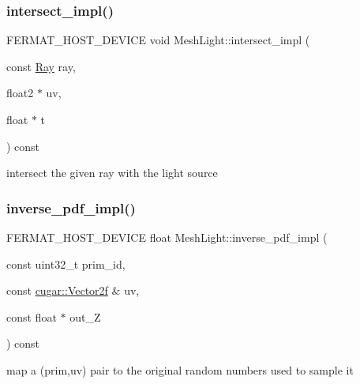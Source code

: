 \subsubsection{\texorpdfstring{intersect\+\_\+impl()}{intersect\_impl()}}
{\footnotesize\ttfamily F\+E\+R\+M\+A\+T\+\_\+\+H\+O\+S\+T\+\_\+\+D\+E\+V\+I\+CE void Mesh\+Light\+::intersect\+\_\+impl (\begin{DoxyParamCaption}\item[{const \hyperlink{struct_ray}{Ray}}]{ray,  }\item[{float2 $\ast$}]{uv,  }\item[{float $\ast$}]{t }\end{DoxyParamCaption}) const\hspace{0.3cm}{\ttfamily [inline]}}

intersect the given ray with the light source \mbox{\label{struct_mesh_light_a3c6e89823dc653d7c0b0ce28c0f8f770}} 
\subsubsection{\texorpdfstring{inverse\+\_\+pdf\+\_\+impl()}{inverse\_pdf\_impl()}}
{\footnotesize\ttfamily F\+E\+R\+M\+A\+T\+\_\+\+H\+O\+S\+T\+\_\+\+D\+E\+V\+I\+CE float Mesh\+Light\+::inverse\+\_\+pdf\+\_\+impl (\begin{DoxyParamCaption}\item[{const uint32\+\_\+t}]{prim\+\_\+id,  }\item[{const \hyperlink{structcugar_1_1_vector}{cugar\+::\+Vector2f} \&}]{uv,  }\item[{const float $\ast$}]{out\+\_\+Z }\end{DoxyParamCaption}) const\hspace{0.3cm}{\ttfamily [inline]}}

map a (prim,uv) pair to the original random numbers used to sample it \mbox{\label{struct_mesh_light_a60e26a42c876094525bf87497084c798}} 
